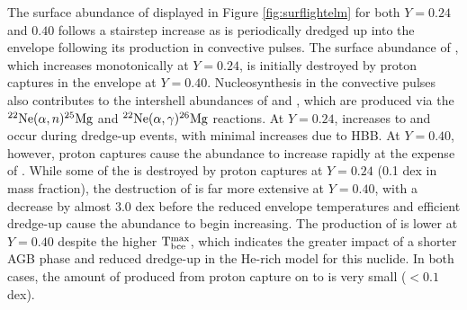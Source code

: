 The surface abundance of  displayed in Figure \ref{fig:surflightelm} for both $Y=0.24$ and $0.40$ follows a stairstep increase as  is periodically dredged up into the envelope following its production in convective pulses. The surface abundance of , which increases monotonically at $Y=0.24$, is initially destroyed by proton captures in the envelope at $Y=0.40$. Nucleosynthesis in the convective pulses also contributes to the intershell abundances of  and , which are produced via the $\mbox{${}^{22}{\text{Ne}}$}(\alpha,n)\mbox{${}^{25}{\text{Mg}}$}$ and $\mbox{${}^{22}{\text{Ne}}$}(\alpha,\gamma)\mbox{${}^{26}{\text{Mg}}$}$ reactions. At $Y=0.24$, increases to  and  occur during dredge-up events, with minimal increases due to HBB. At $Y=0.40$, however, proton captures cause the  abundance to increase rapidly at the expense of . While some of the  is destroyed by proton captures at $Y=0.24$ (0.1 dex in mass fraction), the destruction of  is far more extensive at $Y=0.40$, with a decrease by almost 3.0 dex before the reduced envelope temperatures and efficient dredge-up cause the abundance to begin increasing. The production of  is lower at $Y=0.40$ despite the higher $\mathrm{T}_\mathrm{bce}^\mathrm{max}$, which indicates the greater impact of a shorter AGB phase and reduced dredge-up in the He-rich model for this nuclide. In both cases, the amount of  produced from proton capture on to  is very small ($< 0.1$ dex).

